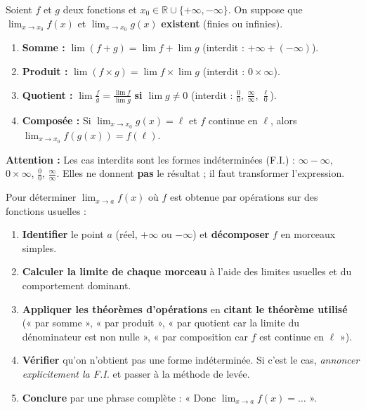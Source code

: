 \documentclass[11pt]{article}
\newcommand{\cle}[1]{{\popxbold\color{popdark}#1}}
\begin{document}
\begin{propriete}
Soient $f$ et $g$ deux fonctions et $x_0 \in \mathbb{R} \cup \{+\infty, -\infty\}$. On suppose que $\lim_{x\to x_0} f(x)$ et $\lim_{x\to x_0} g(x)$ \textbf{existent} (finies ou infinies).
\begin{enumerate}
\item \textbf{Somme :} $\lim (f+g) = \lim f + \lim g$ \quad (interdit : $+\infty + (-\infty)$).
\item \textbf{Produit :} $\lim (f\times g) = \lim f \times \lim g$ \quad (interdit : $0 \times \infty$).
\item \textbf{Quotient :} $\lim \frac{f}{g} = \frac{\lim f}{\lim g}$ \quad \textbf{si $\lim g \neq 0$} (interdit : $\frac{0}{0}$, $\frac{\infty}{\infty}$, $\frac{\ell}{0}$).
\item \textbf{Composée :} Si $\lim_{x\to x_0} g(x) = \ell$ et $f$ continue en $\ell$, alors $\lim_{x\to x_0} f(g(x)) = f(\ell)$.
\end{enumerate}
\textbf{Attention :} Les cas interdits sont les \cle{formes indéterminées} (F.I.) : $\infty-\infty$, $0\times\infty$, $\frac{0}{0}$, $\frac{\infty}{\infty}$. Elles ne donnent \textbf{pas} le résultat ; il faut transformer l'expression.
\end{propriete}

\begin{methode}
Pour déterminer $\displaystyle\lim_{x\to a} f(x)$ où $f$ est obtenue par opérations sur des fonctions usuelles :
\begin{enumerate}
\item \textbf{Identifier} le point $a$ (réel, $+\infty$ ou $-\infty$) et \textbf{décomposer} $f$ en morceaux simples.
\item \textbf{Calculer la limite de chaque morceau} à l'aide des limites usuelles et du comportement dominant.
\item \textbf{Appliquer les théorèmes d'opérations} en \textbf{citant le théorème utilisé} (« par somme », « par produit », « par quotient car la limite du dénominateur est non nulle », « par composition car $f$ est continue en $\ell$ »).
\item \textbf{Vérifier} qu'on n'obtient pas une forme indéterminée. Si c'est le cas, \emph{annoncer explicitement la F.I.} et passer à la méthode de levée.
\item \textbf{Conclure} par une phrase complète : « Donc $\displaystyle\lim_{x\to a} f(x) = \ldots$ ».
\end{enumerate}
\end{methode}
\end{document}
